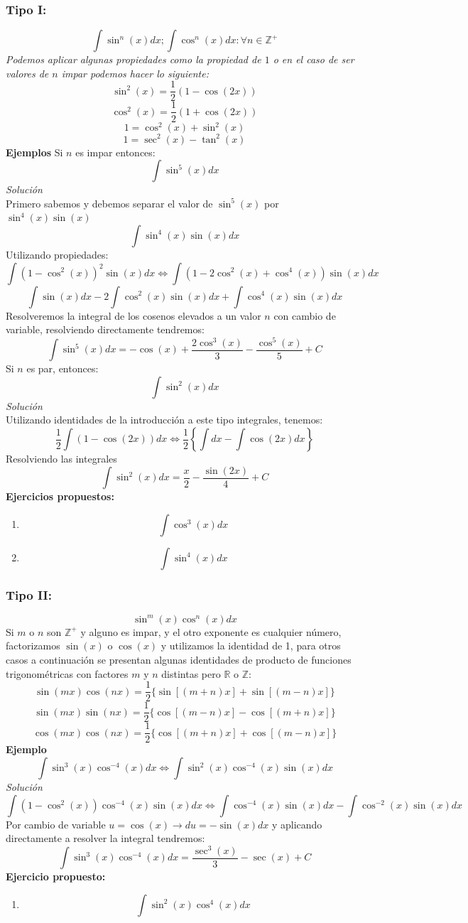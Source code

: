 \documentclass[10pt,executivepaper]{article}
\begin{document}
\subsubsection{Tipo I:}
\[\int\sin^{n}(x)dx;\int\cos^{n}(x)dx\colon\forall n\in\mathbb{Z^{+}}\]
\textit{Podemos aplicar algunas propiedades como la propiedad de $1$ o en el caso de ser valores de $n$ impar podemos hacer lo siguiente:}
\[\sin^{2}(x)=\frac{1}{2}(1-\cos(2x))\]
\[\cos^{2}(x)=\frac{1}{2}(1+\cos(2x))\]
\[1=\cos^{2}(x)+\sin^{2}(x)\]
\[1=\sec^{2}(x)-\tan^{2}(x)\]
\textbf{Ejemplos}
Si $n$ es impar entonces:
\[\int \sin^{5}(x)dx\]
\textit{Solución}
\\
Primero sabemos y debemos separar el valor de $\sin^{5}(x)$ por $\sin^{4}(x)\sin(x)$
\[\int\sin^{4}(x)\sin(x)dx\]
Utilizando propiedades:
\[\int(1-\cos^{2}(x))^{2}\sin(x)dx \Leftrightarrow \int(1-2\cos^{2}(x)+\cos^{4}(x))\sin(x)dx\]
\[\int\sin(x)dx - 2\int\cos^{2}(x)\sin(x)dx + \int\cos^{4}(x)\sin(x)dx\]
Resolveremos la integral de los cosenos elevados a un valor $n$ con cambio de variable, resolviendo directamente tendremos:
\[\int \sin^{5}(x)dx=-\cos(x)+\frac{2\cos^3(x)}{3}-\frac{\cos^{5}(x)}{5}+C\]
\vspace{0.75cm}
Si $n$ es par, entonces:
\[\int\sin^{2}(x)dx\]
\textit{Solución}\\
Utilizando identidades de la introducción a este tipo integrales, tenemos:
\[\frac{1}{2}\int(1-\cos(2x))dx \Leftrightarrow \frac{1}{2}\left\{\int dx - \int\cos(2x)dx\right\}\]
Resolviendo las integrales
\[\int\sin^{2}(x)dx=\frac{x}{2}-\frac{\sin(2x)}{4}+C\]
\clearpage
\textbf{Ejercicios propuestos:}
\begin{enumerate}
  \item \[\int\cos^{3}(x)dx\]
  \item \[\int\sin^{4}(x)dx\]
\end{enumerate}


\subsubsection{Tipo II:}
\[\sin^{m}(x)\cos^{n}(x)dx\]
Si $m$ o $n$ son $\mathbb{Z^{+}}$ y alguno es impar, y el otro exponente es cualquier número, factorizamos $\sin(x)$ o $\cos(x)$ y utilizamos la identidad de 1, para otros casos a continuación se presentan algunas identidades de producto de funciones trigonométricas con factores $m$ y $n$ distintas pero $\mathbb{R}$ o $\mathbb{Z}$:
\[\sin(mx)\cos(nx)=\frac{1}{2}\{\sin[(m+n)x]+\sin[(m-n)x]\}\]
\[\sin(mx)\sin(nx)=\frac{1}{2}\{\cos[(m-n)x]-\cos[(m+n)x]\}\]
\[\cos(mx)\cos(nx)=\frac{1}{2}\{\cos[(m+n)x]+\cos[(m-n)x]\}\]
\textbf{Ejemplo}
\[\int\sin^{3}(x)\cos^{-4}(x)dx \Leftrightarrow \int\sin^{2}(x)\cos^{-4}(x)\sin(x)dx\]
\textit{Solución}
\[\int(1-\cos^{2}(x))\cos^{-4}(x)\sin(x)dx \Leftrightarrow \int\cos^{-4}(x)\sin(x)dx - \int\cos^{-2}(x)\sin(x)dx\]
Por cambio de variable $u=\cos(x) \rightarrow du=-\sin(x)dx$ y aplicando directamente a resolver la integral tendremos:
\[\int\sin^{3}(x)\cos^{-4}(x)dx = \frac{\sec^{3}(x)}{3}-\sec(x) +C\]
\textbf{Ejercicio propuesto:}
\begin{enumerate}
  \item \[\int\sin^{2}(x)\cos^{4}(x)dx\]
\end{enumerate}
\clearpage
\end{document}
